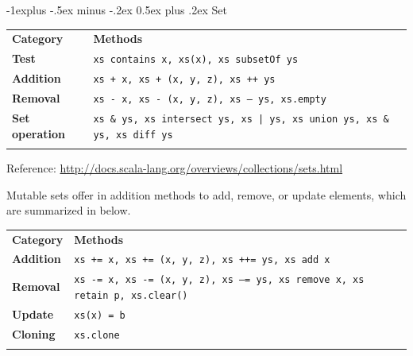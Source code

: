 \documentclass[a4paper,twoside,10pt,landscape]{article}
\makeatletter
\renewcommand{\subsection}{\@startsection{subsection}{2}{0mm}%
                                {-1explus -.5ex minus -.2ex}%
                                {0.5ex plus .2ex}%
                                {\normalfont\normalsize\bfseries}}
\makeatother
\begin{document}
\begin{multicols}{3}
\subsection{Set}
\begin{center}
\begin{tabular}{@{}lp{6.5cm}@{}}
\hline\noalign{\smallskip}
\textbf{Category} & \textbf{Methods} \\
\noalign{\smallskip}\hline\noalign{\smallskip}
\textbf{Test} & \texttt{xs contains x, xs(x), xs subsetOf ys}\\
\textbf{Addition} & \texttt{xs + x, xs + (x, y, z), xs ++ ys}\\
\textbf{Removal} & \texttt{xs - x, xs - (x, y, z), xs -- ys, xs.empty}\\
\textbf{Set operation} & \texttt{xs \& ys, xs intersect ys, xs | ys, xs union ys, xs \&~ ys, xs diff ys}\\
\noalign{\smallskip}\hline
\end{tabular}
\raggedright{\tiny{Reference: \url{http://docs.scala-lang.org/overviews/collections/sets.html}}}
\end{center}

Mutable sets offer in addition methods to add, remove, or update elements, which are summarized in below.

\begin{center}
\begin{tabular}{@{}lp{6.5cm}@{}}
\hline\noalign{\smallskip}
\textbf{Category} & \textbf{Methods} \\
\noalign{\smallskip}\hline\noalign{\smallskip}
\textbf{Addition} & \texttt{xs += x, xs += (x, y, z), xs ++= ys, xs add x}\\
\textbf{Removal} & \texttt{xs -= x, xs -= (x, y, z), xs --= ys, xs remove x, xs retain p, xs.clear()}\\
\textbf{Update} & \texttt{xs(x) = b}\\
\textbf{Cloning} & \texttt{xs.clone}\\
\noalign{\smallskip}\hline
\end{tabular}
\end{center}



\end{multicols}
\end{document}
